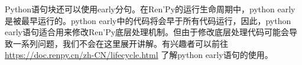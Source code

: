 \begin{ExtraKnowledge}
    Python语句块还可以使用early分句。在Ren'Py的运行生命周期中，python early是被最早运行的。python early中的代码将会早于所有代码运行，因此，python early语句适合用来修改Ren'Py底层处理机制。但由于修改底层处理代码可能会导致一系列问题，我们不会在这里展开讲解。有兴趣者可以前往 \url{https://doc.renpy.cn/zh-CN/lifecycle.html} 了解python early语句的使用。
\end{ExtraKnowledge}

